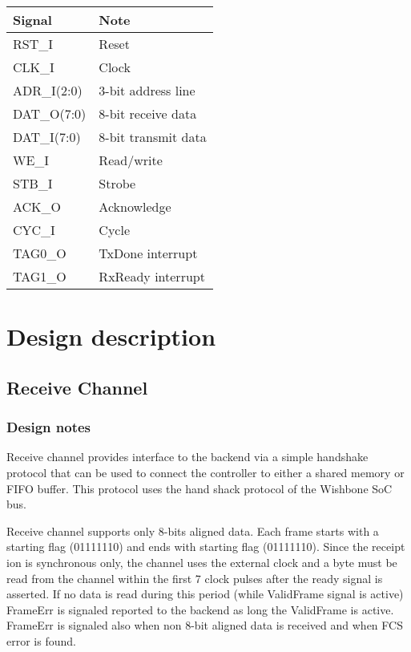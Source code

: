 \documentclass[a4paper,11pt]{article}
\begin{document}
\begin{tabular}{|l|l|}
\hline
Signal& Note\\
\hline
\hline
RST\_I& Reset\\
CLK\_I& Clock\\
ADR\_I(2:0)& 3-bit address line\\
DAT\_O(7:0)& 8-bit receive data\\
DAT\_I(7:0)& 8-bit transmit data\\
WE\_I& Read/write\\
STB\_I& Strobe\\
ACK\_O& Acknowledge\\
CYC\_I& Cycle\\
TAG0\_O& TxDone interrupt\\
TAG1\_O& RxReady interrupt\\
\hline
\end{tabular}

\section{Design description}


\subsection{Receive Channel}

\subsubsection{Design notes}

Receive channel provides interface to the backend via a simple handshake protocol that can be used to connect the controller to either a shared memory or FIFO buffer. This protocol uses the hand shack protocol of the Wishbone SoC bus.

Receive channel supports only 8-bits aligned data. Each frame starts with a starting flag (01111110) and ends with starting flag (01111110). Since the receipt ion is synchronous only, the channel uses the external clock and a byte must be read from the channel within the first 7 clock pulses after the ready signal is asserted. If no data is read during this period (while ValidFrame signal is active) FrameErr is signaled reported to the backend as long the ValidFrame is active. FrameErr is signaled also when non 8-bit aligned data is received and when FCS error is found.
\end{document}
